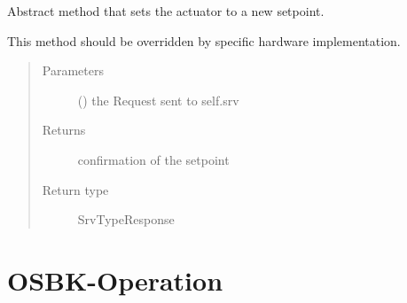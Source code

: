 \documentclass[a4paper,12pt,english]{article}
\begin{document}
\begin{fulllineitems}
\begin{fulllineitems}
\end{fulllineitems}


\begin{fulllineitems}
\label{\detokenize{osbk_devices:osbk_devices.actuator_base.ActuatorBase.set_actuator}}
Abstract method that sets the actuator to a new setpoint.

This method should be overridden by specific hardware implementation.
\begin{quote}\begin{description}
\item[{Parameters}] \leavevmode
{} () \textendash{} the Request sent to self.srv

\item[{Returns}] \leavevmode
confirmation of the setpoint

\item[{Return type}] \leavevmode
SrvTypeResponse

\end{description}\end{quote}

\end{fulllineitems}


\end{fulllineitems}



\chapter{OSBK-Operation}
\label{\detokenize{osbk_operation:osbk-operation}}\label{\detokenize{osbk_operation::doc}}\label{\detokenize{osbk_operation:module-osbk_operation.actuator_state_machine}}
\end{document}
